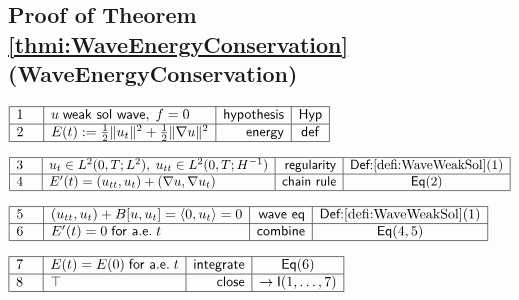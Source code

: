 \documentclass[11pt,reqno]{amsart}
\begin{document}
	\subsection*{Proof of Theorem \protect\ref{thmi:WaveEnergyConservation} (\textsf{WaveEnergyConservation})}
	\noindent$\begin{array}{|m{0.5cm}|l|r|c|}
	\hline
	1 & u\;\mathsf{weak\ sol\ wave},\;f=0 & \mathsf{hypothesis} & \mathsf{Hyp} \\ \hline
	2 & E(t):=\tfrac12\|u_{t}\|^{2}+\tfrac12\|\nabla u\|^{2} & \mathsf{energy} & \mathsf{def} \\ \hline
	\end{array}$
	\par\nointerlineskip\noindent$\begin{array}{|m{0.5cm}|l|r|c|}
	\hline
	3 & u_{t}\in L^{2}(0,T;L^{2}),\;u_{tt}\in L^{2}(0,T;H^{-1}) & \mathsf{regularity} & \textsf{Def:}\ref{defi:WaveWeakSol}(1) \\ \hline
	4 & E^{\prime}(t)=(u_{tt},u_{t})+(\nabla u,\nabla u_{t}) & \mathsf{chain\ rule} & \mathsf{Eq}(2) \\ \hline
	\end{array}$
	\par\nointerlineskip\noindent$\begin{array}{|m{0.5cm}|l|r|c|}
	\hline
	5 & (u_{tt},u_{t})+B[u,u_{t}]=\langle 0,u_{t}\rangle=0 & \mathsf{wave\ eq} & \textsf{Def:}\ref{defi:WaveWeakSol}(1) \\ \hline
	6 & E^{\prime}(t)=0\;\mathsf{for\ a.e.}\;t & \mathsf{combine} & \mathsf{Eq}(4,5) \\ \hline
	\end{array}$
	\par\nointerlineskip\noindent$\begin{array}{|m{0.5cm}|l|r|c|}
	\hline
	7 & E(t)=E(0)\;\mathsf{for\ a.e.}\;t & \mathsf{integrate} & \mathsf{Eq}(6) \\ \hline
	8 & \top & \mathsf{close} & \to\mathsf{I}(1,\dots,7) \\ \hline
	\end{array}$
	\medskip
	
\end{document}
